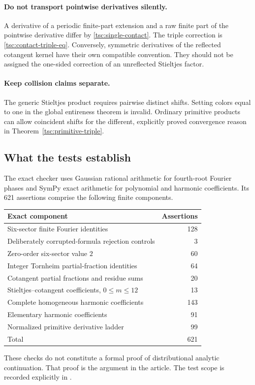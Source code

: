 \paragraph{Do not transport pointwise derivatives silently.}
A derivative of a periodic finite-part extension and a raw finite part of
the pointwise derivative differ by \eqref{tsc:single-contact}. The triple
correction is \eqref{tsc:contact-triple-eq}. Conversely, symmetric derivatives
of the reflected cotangent kernel have their own compatible convention.
They should not be assigned the one-sided correction of an unreflected
Stieltjes factor.

\paragraph{Keep collision claims separate.}
The generic Stieltjes product requires pairwise distinct shifts. Setting
colors equal to one in the global entireness theorem is invalid. Ordinary
primitive products can allow coincident shifts for the different,
explicitly proved convergence reason in Theorem~\ref{tsc:primitive-triple}.

\subsection{What the tests establish}
The exact checker uses Gaussian rational arithmetic for fourth-root Fourier
phases and SymPy exact arithmetic for polynomial and harmonic coefficients.
Its 621 assertions comprise the following finite components.
\begin{center}
\begin{tabular}{lr}
\toprule
Exact component & Assertions\\\midrule
Six-sector finite Fourier identities & 128\\
Deliberately corrupted-formula rejection controls & 3\\
Zero-order six-sector value $2$ & 60\\
Integer Tornheim partial-fraction identities & 64\\
Cotangent partial fractions and residue sums & 20\\
Stieltjes--cotangent coefficients, $0\le m\le12$ & 13\\
Complete homogeneous harmonic coefficients & 143\\
Elementary harmonic coefficients & 91\\
Normalized primitive derivative ladder & 99\\\midrule
Total & 621\\\bottomrule
\end{tabular}
\end{center}
These checks do not constitute a formal proof of distributional analytic
continuation. That proof is the argument in the article. The test scope is
recorded explicitly in .

